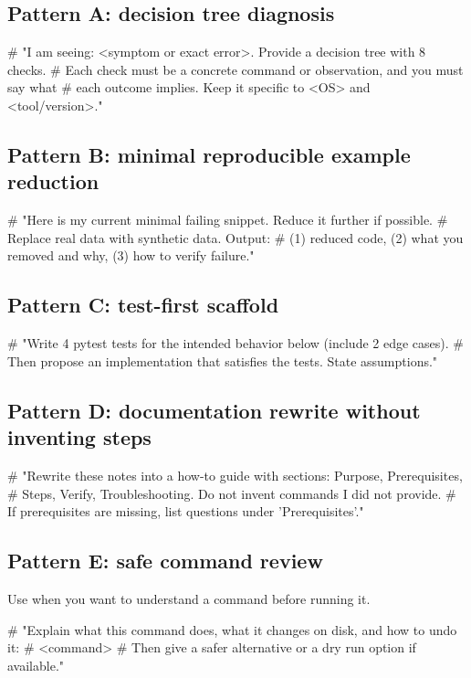 \subsection{Pattern A: decision tree diagnosis}
\begin{fullcode}
# "I am seeing: <symptom or exact error>. Provide a decision tree with 8 checks.
# Each check must be a concrete command or observation, and you must say what
# each outcome implies. Keep it specific to <OS> and <tool/version>."
\end{fullcode}

\subsection{Pattern B: minimal reproducible example reduction}
\begin{fullcode}
# "Here is my current minimal failing snippet. Reduce it further if possible.
# Replace real data with synthetic data. Output:
# (1) reduced code, (2) what you removed and why, (3) how to verify failure."
\end{fullcode}

\subsection{Pattern C: test-first scaffold}
\begin{fullcode}
# "Write 4 pytest tests for the intended behavior below (include 2 edge cases).
# Then propose an implementation that satisfies the tests. State assumptions."
\end{fullcode}

\subsection{Pattern D: documentation rewrite without inventing steps}
\begin{fullcode}
# "Rewrite these notes into a how-to guide with sections: Purpose, Prerequisites,
# Steps, Verify, Troubleshooting. Do not invent commands I did not provide.
# If prerequisites are missing, list questions under 'Prerequisites'."
\end{fullcode}

\subsection{Pattern E: safe command review}
Use when you want to understand a command before running it.
\begin{fullcode}
# "Explain what this command does, what it changes on disk, and how to undo it:
# <command>
# Then give a safer alternative or a dry run option if available."
\end{fullcode}

